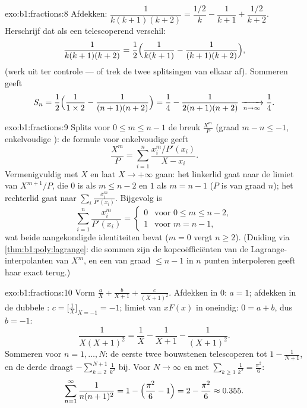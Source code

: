 \begin{solution}{exo:b1:fractions:8}
Afdekken: $\dfrac{1}{k(k+1)(k+2)} = \dfrac{1/2}{k} - \dfrac{1}{k+1} +
\dfrac{1/2}{k+2}$. Herschrijf dat als een telescoperend verschil:
\[
\frac{1}{k(k+1)(k+2)}
= \frac12\Bigl(\frac{1}{k(k+1)} - \frac{1}{(k+1)(k+2)}\Bigr),
\]
(werk uit ter controle --- of trek de twee splitsingen van elkaar af).
Sommeren geeft
\[
S_n = \frac12\Bigl(\frac{1}{1 \times 2} - \frac{1}{(n+1)(n+2)}\Bigr)
= \frac14 - \frac{1}{2(n+1)(n+2)}
\xrightarrow[n \to \infty]{} \frac14 .
\]
\end{solution}

\begin{solution}{exo:b1:fractions:9}
Splits voor $0 \leq m \leq n - 1$ de breuk $\frac{X^m}{P}$ (graad $m - n
\leq -1$, enkelvoudige ): de formule voor enkelvoudige  geeft
\[
\frac{X^m}{P} = \sum_{i=1}^{n} \frac{x_i^m / P'(x_i)}{X - x_i} .
\]
Vermenigvuldig met $X$ en laat $X \to +\infty$ gaan: het linkerlid gaat
naar de limiet van $X^{m+1}/P$, die $0$ is als $m \leq n - 2$ en $1$ als
$m = n - 1$ ($P$ is  van graad $n$); het rechterlid gaat naar
$\sum_i \frac{x_i^m}{P'(x_i)}$. Bijgevolg is
\[
\sum_{i=1}^{n} \frac{x_i^{m}}{P'(x_i)} =
\begin{cases}
0 & \text{voor } 0 \leq m \leq n-2,\\
1 & \text{voor } m = n - 1,
\end{cases}
\]
wat beide aangekondigde identiteiten bevat ($m = 0$ vergt $n \geq 2$).
(Duiding via \cref{thm:b1:poly:lagrange}: die sommen zijn de
kopcoëfficiënten van de Lagrange-interpolanten van $X^m$, en een 
van graad $\leq n-1$ in $n$ punten interpoleren geeft haar exact terug.)
\end{solution}

\begin{solution}{exo:b1:fractions:10}
Vorm $\frac aX + \frac b{X+1} + \frac c{(X+1)^2}$. Afdekken in $0$: $a =
1$; afdekken in de dubbele : $c = \bigl[\frac1X \bigr]_{X=-1} = -1$;
limiet van $xF(x)$ in oneindig: $0 = a + b$, dus $b = -1$:
\[
\frac{1}{X(X+1)^2} = \frac1X - \frac1{X+1} - \frac1{(X+1)^2} .
\]
Sommeren voor $n = 1, \dots, N$: de eerste twee bouwstenen telescoperen
tot $1 - \frac1{N+1}$, en de derde draagt $-\sum_{k=2}^{N+1} \frac1{k^2}$
bij. Voor $N \to \infty$ en met $\sum_{k\geq1} \frac1{k^2} =
\frac{\pi^2}6$:
\[
\sum_{n=1}^{\infty}\frac{1}{n(n+1)^2}
= 1 - \Bigl(\frac{\pi^2}6 - 1\Bigr) = 2 - \frac{\pi^2}6
\approx 0.355 .
\]
\end{solution}

